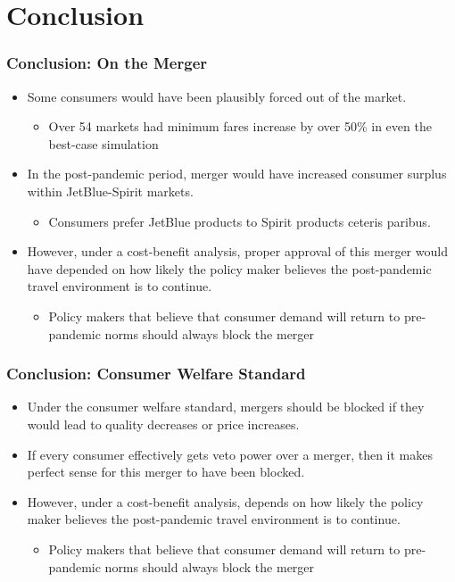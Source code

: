 \documentclass[xcolor=dvipsnames]{beamer}
\begin{document}
    \section{Conclusion}
    \begin{frame}
        \frametitle{Conclusion: On the Merger}
        \begin{itemize}
            \item Some consumers would have been plausibly forced out of the market.
            \begin{itemize}
                \item Over 54 markets had minimum fares increase by over 50\% in even the best-case simulation
            \end{itemize}
            \item In the post-pandemic period, merger would have increased consumer surplus within JetBlue-Spirit markets.
            \begin{itemize}
                \item Consumers prefer JetBlue products to Spirit products ceteris paribus.
            \end{itemize}
            \item However, under a cost-benefit analysis, proper approval of this merger would have depended on how likely the policy maker believes the post-pandemic travel environment is to continue.
            \begin{itemize}
                \item Policy makers that believe that consumer demand will return to pre-pandemic norms should always block the merger
            \end{itemize}
        \end{itemize}
    \end{frame} 

    
    \begin{frame}
        \frametitle{Conclusion: Consumer Welfare Standard}
        \begin{itemize}
            \item Under the consumer welfare standard, mergers should be blocked if they would lead to quality decreases or price increases.
            \item If every consumer effectively gets veto power over a merger, then it makes perfect sense for this merger to have been blocked.
            \item However, under a cost-benefit analysis, depends on how likely the policy maker believes the post-pandemic travel environment is to continue.
            \begin{itemize}
                \item Policy makers that believe that consumer demand will return to pre-pandemic norms should always block the merger
            \end{itemize}
        \end{itemize}
    \end{frame}
\end{document}
